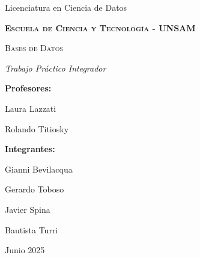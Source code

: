 \documentclass[10pt]{article}
\begin{document}
\begin{titlepage}
{
    \centering
    {\Large Licenciatura en Ciencia de Datos \par}
    {\bfseries\scshape\Large Escuela de Ciencia y Tecnología - UNSAM \par}
    \vspace{3cm}
    {\scshape\Huge Bases de Datos \par}
    {\itshape\Large Trabajo Práctico Integrador \par}
    \vfill
}
{\bfseries{\Large Profesores:}}

{\Large Laura Lazzati}

{\Large Rolando Titiosky}
\vspace{1cm}

{\bfseries{\Large Integrantes:}}

{\Large Gianni Bevilacqua}

{\Large Gerardo Toboso}

{\Large Javier Spina}

{\Large Bautista Turri}
\vfill
{\Large Junio 2025 \par}
\end{titlepage}





\end{document}
